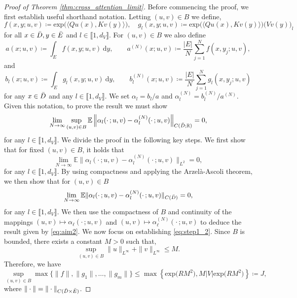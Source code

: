 \documentclass[twoside]{article}
\newcommand{\1}{\mathbbm{1}}
\newcommand{\R}{\mathbbm{R}}
\newcommand{\range}[2]{\llbracket #1, #2 \rrbracket}
\providecommand{\mathbbm}{\mathbb} %
\newcommand{\E}{\mathbb{E}}
\begin{document}
\begin{proof}[Proof of Theorem \ref{thm:cross_attention_limit}]
Before commencing the proof, we first establish useful shorthand notation. Letting \((u,v) \in B\) we define,
\[f(x,y;u,v) \coloneqq \mathrm{exp} \big ( \langle Q u(x), K v(y) \rangle \big ), \quad g_l(x,y;u,v) \coloneqq \mathrm{exp} \big ( \langle Q u(x), K v(y) \rangle \big ) \big( Vv(y) \big )_l  \]
for all \(x\in \Bar{D}, y\in\Bar{E}\) and \(l \in \range{1}{d_V}\). For $(u,v) \in B$ we also define
\[a(x;u,v) \coloneqq \int_E f(x,y;u,v) \: \mathrm{d}y, \qquad a^{(N)}(x;u,v) \coloneqq \frac{|E|}{N} \sum_{j=1}^N f(x,y_j;u,v),\]
and
\[b_l(x;u,v) \coloneqq \int_E g_l(x,y;u,v) \: \mathrm{d}y, \qquad b^{(N)}_l(x;u,v) \coloneqq \frac{|E|}{N} \sum_{j=1}^N g_l(x,y_j;u,v)\]
for any $x\in\Bar{D}$ and any \(l \in \range{1}{d_V}\). We set \(\alpha_l = b_l/a\) and \(\alpha_l^{(N)} = b_l^{(N)}/a^{(N)}\). Given this notation, to prove the result we must show
\begin{equation}
\label{eq:aim2}
\lim_{N \to \infty} \sup_{(u,v) \in B} \E \left \| \alpha_l(\cdot\,;u,v) - \alpha_l^{(N)}(\cdot\,;u,v) \right\|_{C(\Bar{D};\R)}=0,
\end{equation}
for any $l\in\range{1}{d_V}$. We divide the proof in the following key steps. We first show that for fixed $(u,v)\in B$, it holds that
\begin{equation}
\label{eq:step1_2}
    \lim_{N \to \infty} \E \|\alpha_l(\cdot\,;u,v) - \alpha_l^{(N)}(\cdot\,;u,v)\|_{L^2} = 0,
\end{equation}
for any $l\in\range{1}{d_V}$. By using compactness and applying the Arzelà-Ascoli theorem, we then show that for $(u,v)\in B$
\begin{equation}
\label{eq:step2_2}
\lim_{N \to \infty} \E \|\alpha_l(\cdot\,;u,v) - \alpha_l^{(N)}(\cdot\,;u,v)\|_{C(\Bar{D})} = 0,
\end{equation}
for any $l\in\range{1}{d_V}$. We then use the compactness of $B$ and continuity of the mappings $(u,v)\mapsto \alpha_\ell(\cdot\, ;u,v)$ and $(u,v)\mapsto \alpha^{(N)}_\ell(\cdot\, ;u,v)$ to deduce the result given by \eqref{eq:aim2}.
We now focus on establishing \eqref{eq:step1_2}. Since \(B\) is bounded, there exists a constant \(M > 0\) such that,
\[\sup_{(u,v) \in B} \|u\|_{L^\infty}+\|v\|_{L^\infty} \leq M.\]
Therefore, we have
\[\sup_{(u,v) \in B} \max \{ \|f\|, \|g_1\|, \dots, \|g_m\| \} \leq \max \left \{ \text{exp} \big( RM^2 \big ), M |V| \text{exp} \big (RM^2 \big ) \right \} \coloneqq J,\]
where \(\|\cdot\| = \|\cdot\|_{C(\Bar{D} \times \Bar{E})}\).

\end{proof}
\end{document}
